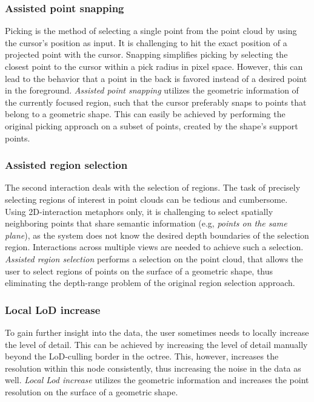\subsubsection{Assisted point snapping}
Picking is the method of selecting a single point from the point cloud by using the cursor's position as input. It is challenging to hit the exact position of a projected point with the cursor. Snapping simplifies picking by selecting the closest point to the cursor within a pick radius in pixel space. However, this can lead to the behavior that a point in the back is favored instead of a desired point in the foreground. 
\textit{Assisted point snapping} utilizes the geometric information of the currently focused region, such that the cursor preferably snaps to points that belong to a geometric shape. This can easily be achieved by performing the original picking approach on a subset of points, created by the shape's support points.
\\
\subsubsection{Assisted region selection}
The second interaction deals with the selection of regions. The task of precisely selecting regions of interest in point clouds can be tedious and cumbersome. Using 2D-interaction metaphors only, it is challenging to select spatially neighboring points that share semantic information (e.g, \textit{points on the same plane}), as the system does not know the desired depth boundaries of the selection region. Interactions across multiple views are needed to achieve such a selection. \textit{Assisted region selection} performs a selection on the point cloud, that allows the user to select regions of points on the surface of a geometric shape, thus eliminating the depth-range problem of the original region selection approach. 
\\
\subsubsection{Local LoD increase}
To gain further insight into the data, the user sometimes needs to locally increase the level of detail. This can be achieved by increasing the level of detail manually beyond the LoD-culling border in the octree. This, however, increases the resolution within this node consistently, thus increasing the noise in the data as well. \textit{Local Lod increase} utilizes the geometric information and increases the  point resolution on the surface of a geometric shape. 
